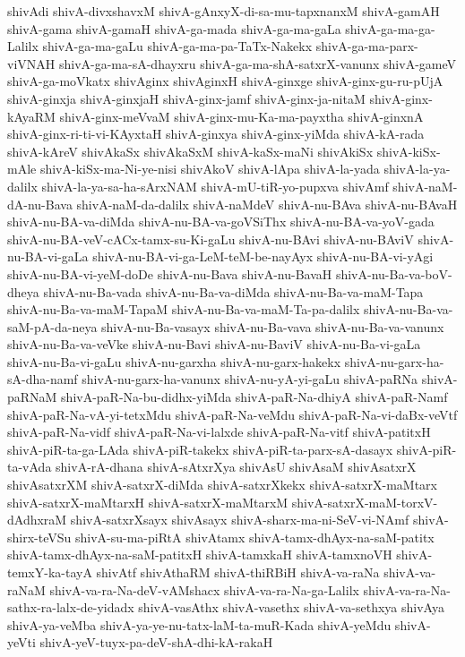 {shivAdi
shivA-divxshavxM
shivA-gAnxyX-di-sa-mu-tapxnanxM
shivA-gamAH
shivA-gama
shivA-gamaH
shivA-ga-mada
shivA-ga-ma-gaLa
shivA-ga-ma-ga-Lalilx
shivA-ga-ma-gaLu
shivA-ga-ma-pa-TaTx-Nakekx
shivA-ga-ma-parx-viVNAH
shivA-ga-ma-sA-dhayxru
shivA-ga-ma-shA-satxrX-vanunx
shivA-gameV
shivA-ga-moVkatx
shivAginx
shivAginxH
shivA-ginxge
shivA-ginx-gu-ru-pUjA
shivA-ginxja
shivA-ginxjaH
shivA-ginx-jamf
shivA-ginx-ja-nitaM
shivA-ginx-kAyaRM
shivA-ginx-meVvaM
shivA-ginx-mu-Ka-ma-payxtha
shivA-ginxnA
shivA-ginx-ri-ti-vi-KAyxtaH
shivA-ginxya
shivA-ginx-yiMda
shivA-kA-rada
shivA-kAreV
shivAkaSx
shivAkaSxM
shivA-kaSx-maNi
shivAkiSx
shivA-kiSx-mAle
shivA-kiSx-ma-Ni-ye-nisi
shivAkoV
shivA-lApa
shivA-la-yada
shivA-la-ya-dalilx
shivA-la-ya-sa-ha-sArxNAM
shivA-mU-tiR-yo-pupxva
shivAmf
shivA-naM-dA-nu-Bava
shivA-naM-da-dalilx
shivA-naMdeV
shivA-nu-BAva
shivA-nu-BAvaH
shivA-nu-BA-va-diMda
shivA-nu-BA-va-goVSiThx
shivA-nu-BA-va-yoV-gada
shivA-nu-BA-veV-cACx-tamx-su-Ki-gaLu
shivA-nu-BAvi
shivA-nu-BAviV
shivA-nu-BA-vi-gaLa
shivA-nu-BA-vi-ga-LeM-teM-be-nayAyx
shivA-nu-BA-vi-yAgi
shivA-nu-BA-vi-yeM-doDe
shivA-nu-Bava
shivA-nu-BavaH
shivA-nu-Ba-va-boV-dheya
shivA-nu-Ba-vada
shivA-nu-Ba-va-diMda
shivA-nu-Ba-va-maM-Tapa
shivA-nu-Ba-va-maM-TapaM
shivA-nu-Ba-va-maM-Ta-pa-dalilx
shivA-nu-Ba-va-saM-pA-da-neya
shivA-nu-Ba-vasayx
shivA-nu-Ba-vava
shivA-nu-Ba-va-vanunx
shivA-nu-Ba-va-veVke
shivA-nu-Bavi
shivA-nu-BaviV
shivA-nu-Ba-vi-gaLa
shivA-nu-Ba-vi-gaLu
shivA-nu-garxha
shivA-nu-garx-hakekx
shivA-nu-garx-ha-sA-dha-namf
shivA-nu-garx-ha-vanunx
shivA-nu-yA-yi-gaLu
shivA-paRNa
shivA-paRNaM
shivA-paR-Na-bu-didhx-yiMda
shivA-paR-Na-dhiyA
shivA-paR-Namf
shivA-paR-Na-vA-yi-tetxMdu
shivA-paR-Na-veMdu
shivA-paR-Na-vi-daBx-veVtf
shivA-paR-Na-vidf
shivA-paR-Na-vi-lalxde
shivA-paR-Na-vitf
shivA-patitxH
shivA-piR-ta-ga-LAda
shivA-piR-takekx
shivA-piR-ta-parx-sA-dasayx
shivA-piR-ta-vAda
shivA-rA-dhana
shivA-sAtxrXya
shivAsU
shivAsaM
shivAsatxrX
shivAsatxrXM
shivA-satxrX-diMda
shivA-satxrXkekx
shivA-satxrX-maMtarx
shivA-satxrX-maMtarxH
shivA-satxrX-maMtarxM
shivA-satxrX-maM-torxV-dAdhxraM
shivA-satxrXsayx
shivAsayx
shivA-sharx-ma-ni-SeV-vi-NAmf
shivA-shirx-teVSu
shivA-su-ma-piRtA
shivAtamx
shivA-tamx-dhAyx-na-saM-patitx
shivA-tamx-dhAyx-na-saM-patitxH
shivA-tamxkaH
shivA-tamxnoVH
shivA-temxY-ka-tayA
shivAtf
shivAthaRM
shivA-thiRBiH
shivA-va-raNa
shivA-va-raNaM
shivA-va-ra-Na-deV-vAMshacx
shivA-va-ra-Na-ga-Lalilx
shivA-va-ra-Na-sathx-ra-lalx-de-yidadx
shivA-vasAthx
shivA-vasethx
shivA-va-sethxya
shivAya
shivA-ya-veMba
shivA-ya-ye-nu-tatx-laM-ta-muR-Kada
shivA-yeMdu
shivA-yeVti
shivA-yeV-tuyx-pa-deV-shA-dhi-kA-rakaH
}
